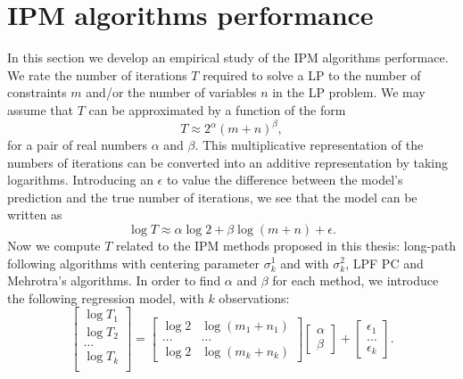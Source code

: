 \documentclass[a4paper,10 pt,titlepage,twoside]{book}
\theoremstyle{plain}
\theoremstyle{definition}
\theoremstyle{remark}
\begin{document}
\section{IPM algorithms performance}
In this section we develop an empirical study of the IPM algorithms performace. \\
We rate the number of iterations $T$ required to solve a LP to the number of constraints $m$ and/or the number of variables $n$ in the LP problem. We may assume that $T$ can be approximated by a function of the form 
\begin{equation*}
	T \approx 2^{\alpha}(m+n)^{\beta},
\end{equation*}
for a pair of real numbers $\alpha$ and $\beta$. This multiplicative representation of the numbers of iterations can be converted into an additive representation by taking logarithms. Introducing an $\epsilon$ to value the difference between the model's prediction and the true number of iterations, we see that the model can be written as
\begin{equation*}
\log T \approx \alpha \log 2 +\beta \log (m+n) +\epsilon.
\end{equation*}
Now we compute $T$ related to the IPM methods proposed in this thesis: long-path following algorithms with centering parameter $\sigma_{k}^{1}$ and with $\sigma_{k}^{2}$, LPF PC and Mehrotra's algorithms. In order to find $\alpha$ and $\beta$  for each method, we introduce the following regression model, with $k$ observations:\\
\begin{equation}
\begin{bmatrix}
\log T_{1}\\\log T_{2}\\\dots\\\log T_{k}\\
\end{bmatrix}
 =
 \begin{bmatrix}
\log 2&\log (m_{1}+n_{1})\\
\dots&\dots\\
\log 2&\log (m_{k}+n_{k})
\end{bmatrix}\begin{bmatrix}
\alpha\\\beta
\end{bmatrix}
+
\begin{bmatrix}
\epsilon_{1}\\
\dots\\
\epsilon_{k}
\end{bmatrix}.
\end{equation}
\end{document}
